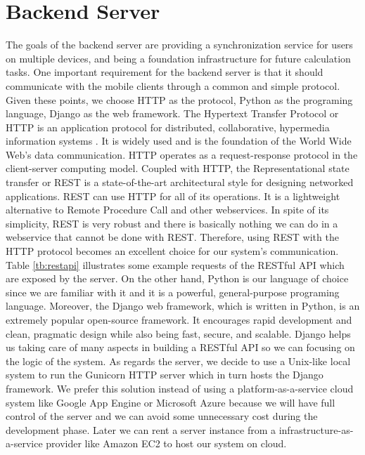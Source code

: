 \section{Backend Server}
The goals of the backend server are providing a synchronization service for users on multiple devices, and being a foundation infrastructure for future calculation tasks. One important requirement for the backend server is that it should communicate with the mobile clients through a common and simple protocol. Given these points, we choose HTTP as the protocol, Python as the programing language, Django as the web framework. The Hypertext Transfer Protocol or HTTP is an application protocol for distributed, collaborative, hypermedia information systems \cite{leach1999hypertext}. It is widely used and is the foundation of the World Wide Web's data communication. HTTP operates as a request-response protocol in the client-server computing model. Coupled with HTTP, the Representational state transfer or REST is a state-of-the-art architectural style for designing networked applications. REST can use HTTP for all of its operations. It is a lightweight alternative to Remote Procedure Call and other webservices. In spite of its simplicity, REST is very robust and there is basically nothing we can do in a webservice that cannot be done with REST. Therefore, using REST with the HTTP protocol becomes an excellent choice for our system's communication. Table \ref{tb:restapi} illustrates some example requests of the RESTful API which are exposed by the server. On the other hand, Python is our language of choice since we are familiar with it and it is a powerful, general-purpose programing language. Moreover, the Django web framework, which is written in Python, is an extremely popular open-source framework. It encourages rapid development and clean, pragmatic design while also being fast, secure, and scalable. Django helps us taking care of many aspects in building a RESTful API so we can focusing on the logic of the system. As regards the server, we decide to use a Unix-like local system to run the Gunicorn HTTP server which in turn hosts the Django framework. We prefer this solution instead of using a platform-as-a-service cloud system like Google App Engine or Microsoft Azure because we will have full control of the server and we can avoid some unnecessary cost during the development phase. Later we can rent a server instance from a infrastructure-as-a-service provider like Amazon EC2 to host our system on cloud.

